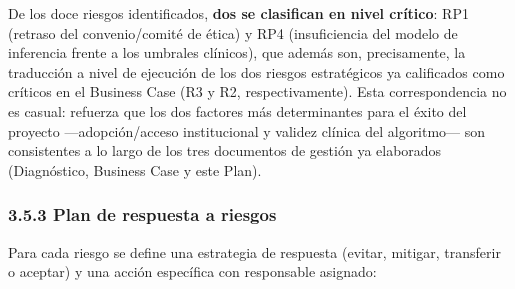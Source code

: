 \documentclass[11pt,a4paper]{article}
\begin{document}
De los doce riesgos identificados, \textbf{dos se clasifican en nivel crítico}: RP1 (retraso del convenio/comité de ética) y RP4 (insuficiencia del modelo de inferencia frente a los umbrales clínicos), que además son, precisamente, la traducción a nivel de ejecución de los dos riesgos estratégicos ya calificados como críticos en el Business Case (R3 y R2, respectivamente). Esta correspondencia no es casual: refuerza que los dos factores más determinantes para el éxito del proyecto ---adopción/acceso institucional y validez clínica del algoritmo--- son consistentes a lo largo de los tres documentos de gestión ya elaborados (Diagnóstico, Business Case y este Plan).

\subsubsection{3.5.3 Plan de respuesta a riesgos}\label{plan-de-respuesta-a-riesgos}

Para cada riesgo se define una estrategia de respuesta (evitar, mitigar, transferir o aceptar) y una acción específica con responsable asignado:
\end{document}
